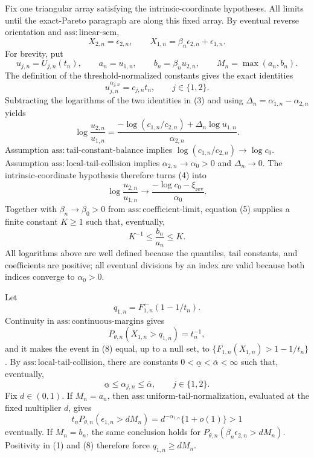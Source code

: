 Fix one triangular array satisfying the intrinsic-coordinate hypotheses. All limits until the exact-Pareto paragraph are along this fixed array. By eventual reverse orientation and \(\mathrm{ass{:}linear\text{-}scm}\),
\[
X_{2,n}=\epsilon_{2,n},
\qquad
X_{1,n}=\beta_n\epsilon_{2,n}+\epsilon_{1,n}.
\tag{1}
\]
For brevity, put
\[
u_{j,n}=U_{j,n}(t_n),
\qquad
a_n=u_{1,n},
\qquad
b_n=\beta_n u_{2,n},
\qquad
M_n=\max(a_n,b_n).
\tag{2}
\]
The definition of the threshold-normalized constants gives the exact identities
\[
u_{j,n}^{\alpha_{j,n}}=c_{j,n}t_n,
\qquad j\in\{1,2\}.
\tag{3}
\]
Subtracting the logarithms of the two identities in (3) and using \(\Delta_n=\alpha_{1,n}-\alpha_{2,n}\) yields
\[
\log\frac{u_{2,n}}{u_{1,n}}
=\frac{-\log(c_{1,n}/c_{2,n})+\Delta_n\log u_{1,n}}
{\alpha_{2,n}}.
\tag{4}
\]
Assumption \(\mathrm{ass{:}tail\text{-}constant\text{-}balance}\) implies
\(\log(c_{1,n}/c_{2,n})\to\log c_0\). Assumption
\(\mathrm{ass{:}local\text{-}tail\text{-}collision}\) implies
\(\alpha_{2,n}\to\alpha_0>0\) and \(\Delta_n\to0\). The intrinsic-coordinate hypothesis therefore turns (4) into
\[
\log\frac{u_{2,n}}{u_{1,n}}
\longrightarrow
\frac{-\log c_0-\xi_{\mathrm{rev}}}{\alpha_0}.
\tag{5}
\]
Together with \(\beta_n\to\beta_0>0\) from
\(\mathrm{ass{:}coefficient\text{-}limit}\), equation (5) supplies a finite
constant \(K\geq1\) such that, eventually,
\[
K^{-1}\leq\frac{b_n}{a_n}\leq K.
\tag{6}
\]
All logarithms above are well defined because the quantiles, tail constants, and
coefficients are positive; all eventual divisions by an index are valid because
both indices converge to \(\alpha_0>0\).

Let
\[
q_{1,n}=F_{1,n}^{\leftarrow}(1-1/t_n).
\tag{7}
\]
Continuity in \(\mathrm{ass{:}continuous\text{-}margins}\) gives
\[
P_{\theta,n}(X_{1,n}>q_{1,n})=t_n^{-1},
\tag{8}
\]
and it makes the event in (8) equal, up to a null set, to
\(\{F_{1,n}(X_{1,n})>1-1/t_n\}\). By
\(\mathrm{ass{:}local\text{-}tail\text{-}collision}\), there are constants
\(0<\underline\alpha<\overline\alpha<\infty\) such that, eventually,
\[
\underline\alpha\leq\alpha_{j,n}\leq\overline\alpha,
\qquad j\in\{1,2\}.
\tag{9}
\]
Fix \(d\in(0,1)\). If \(M_n=a_n\), then
\(\mathrm{ass{:}uniform\text{-}tail\text{-}normalization}\), evaluated at the
fixed multiplier \(d\), gives
\[
t_nP_{\theta,n}(\epsilon_{1,n}>dM_n)
=d^{-\alpha_{1,n}}\{1+o(1)\}>1
\tag{10}
\]
eventually. If \(M_n=b_n\), the same conclusion holds for
\(P_{\theta,n}(\beta_n\epsilon_{2,n}>dM_n)\). Positivity in (1) and (8)
therefore force \(q_{1,n}\geq dM_n\).

